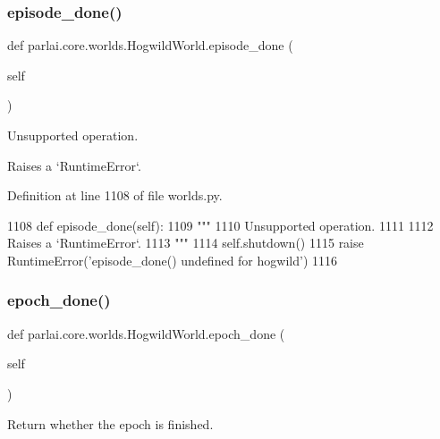 \subsubsection{\texorpdfstring{episode\+\_\+done()}{episode\_done()}}
{\footnotesize\ttfamily def parlai.\+core.\+worlds.\+Hogwild\+World.\+episode\+\_\+done (\begin{DoxyParamCaption}\item[{}]{self }\end{DoxyParamCaption})}

\begin{DoxyVerb}Unsupported operation.

Raises a `RuntimeError`.
\end{DoxyVerb}
 

Definition at line 1108 of file worlds.\+py.


\begin{DoxyCode}
1108     \textcolor{keyword}{def }episode\_done(self):
1109         \textcolor{stringliteral}{"""}
1110 \textcolor{stringliteral}{        Unsupported operation.}
1111 \textcolor{stringliteral}{}
1112 \textcolor{stringliteral}{        Raises a `RuntimeError`.}
1113 \textcolor{stringliteral}{        """}
1114         self.shutdown()
1115         \textcolor{keywordflow}{raise} RuntimeError(\textcolor{stringliteral}{'episode\_done() undefined for hogwild'})
1116 
\end{DoxyCode}
\mbox{\label{classparlai_1_1core_1_1worlds_1_1HogwildWorld_ae80d3f592818ac39b9cf8802270d8d8a}} 
\subsubsection{\texorpdfstring{epoch\+\_\+done()}{epoch\_done()}}
{\footnotesize\ttfamily def parlai.\+core.\+worlds.\+Hogwild\+World.\+epoch\+\_\+done (\begin{DoxyParamCaption}\item[{}]{self }\end{DoxyParamCaption})}

\begin{DoxyVerb}Return whether the epoch is finished.
\end{DoxyVerb}
 

